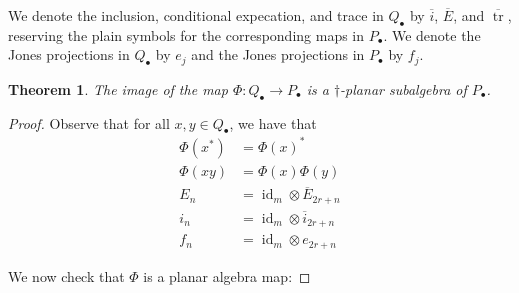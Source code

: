 \documentclass[11pt]{article}
\theoremstyle{plain}
\newtheorem{thm}{Theorem}[section]
\theoremstyle{definition}
\DeclareMathOperator{\id}{id}
\DeclareMathOperator{\tr}{tr}
\begin{document}
We denote the inclusion, conditional expecation, and trace in $Q_{\bullet}$ by $\overline{i}$, $\overline{E}$, and $\overline{\tr}$, reserving the plain symbols for the corresponding maps in $P_{\bullet}$.
We denote the Jones projections in $Q_{\bullet}$ by $e_{j}$ and the Jones projections in $P_{\bullet}$ by $f_{j}$.

\begin{thm}
The image of the map $\Phi:Q_{\bullet} \to P_{\bullet}$ is a $\dag$-planar subalgebra of $P_{\bullet}$.
\end{thm} 

\begin{proof}
Observe that for all $x,y \in Q_{\bullet}$, we have that 
\begin{align*}
 \Phi(x^{*}) &= \Phi(x)^{\ast} \\
 \Phi(xy) &= \Phi(x)\Phi(y) \\
 E_n &= \id_{m}\otimes \overline{E}_{2r+n} \\
 i_n &= \id_{m}\otimes \overline{i}_{2r+n} \\
 f_n &= \id_{m} \otimes e_{2r+n} 
\end{align*}

 We now check that $\Phi$ is a planar algebra map:


\end{proof}
\end{document}
